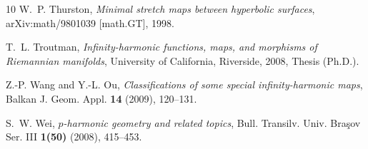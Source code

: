 \documentclass[a4paper]{article}
\theoremstyle{definition}
\theoremstyle{remark}
\begin{document}
\begin{thebibliography}{10}
W.~P. Thurston, \emph{Minimal stretch maps between hyperbolic surfaces},
  arXiv:math/9801039 [math.GT], 1998.

T.~L. Troutman, \emph{Infinity-harmonic functions, maps, and morphisms of
  {R}iemannian manifolds}, University of California, Riverside, 2008, Thesis
  (Ph.D.).

Z.-P. Wang and Y.-L. Ou, \emph{Classifications of some special
  infinity-harmonic maps}, Balkan J. Geom. Appl. \textbf{14} (2009), 120--131.

S.~W. Wei, \emph{{$p$}-harmonic geometry and related topics}, Bull. Transilv.
  Univ. Bra\c sov Ser. III \textbf{1(50)} (2008), 415--453.

\end{thebibliography}
\end{document}
